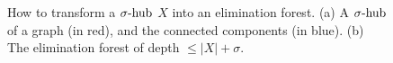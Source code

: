 \begin{figure}
    \centering
    \begin{subfigure}[b]{0.33\textwidth}
        \caption{}
    \end{subfigure}
    \begin{subfigure}[b]{0.27\textwidth}
        \caption{}
    \end{subfigure}
    
    \caption{How to transform a $\sigma\text{-hub}$ $X$ into an elimination forest. (a) A $\sigma\text{-hub}$ of a graph (in red), and the connected components (in blue). (b) The elimination forest of depth $\leq |X| + \sigma$.}
    \label{fig:shub-to-treedepth}
\end{figure}
